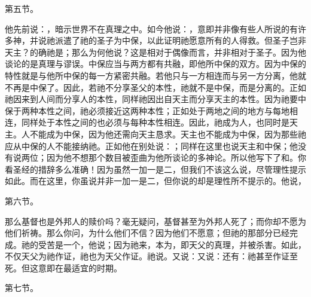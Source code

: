 第五节。\par

他先前说：，暗示世界不在真理之中。如今他说：，意即并非像有些人所说的有许多神，并说祂派遣了祂的圣子为中保，以此证明祂愿意所有的人得救。但圣子岂非天主？的确祂是；那么为何他说？这是相对于偶像而言，并非相对于圣子。因为他谈论的是真理与谬误。中保应当与两方都有共融，即他所中保的双方。因为中保的特性就是与他所中保的每一方紧密共融。若他只与一方相连而与另一方分离，他就不再是中保了。因此，若祂不分享圣父的本性，祂就不是中保，而是分离的。正如祂因来到人间而分享人的本性，同样祂因出自天主而分享天主的本性。因为祂要中保于两种本性之间，祂必须接近这两种本性；正如处于两地之间的地方与每地相连，同样处于本性之间的也必须与每种本性相连。因此，祂成为人，也同时是天主。人不能成为中保，因为他还需向天主恳求。天主也不能成为中保，因为那些祂应从中保的人不能接纳祂。正如他在别处说：；同样在这里也说天主和中保；他没有说两位；因为他不想那个数目被歪曲为他所谈论的多神论。所以他写下了和。你看圣经的措辞多么准确！因为虽然一加一是二，但我们不该这么说，尽管理性提示如此。而在这里，你虽说并非一加一是二，但你说的却是理性所不提示的。他说，\par

第六节。\par

那么基督也是外邦人的赎价吗？毫无疑问，基督甚至为外邦人死了；而你却不愿为他们祈祷。那么你问，为什么他们不信？因为他们不愿意；但祂的那部分已经完成。祂的受苦是一个，他说；因为祂来，本为，即天父的真理，并被杀害。如此，不仅天父为祂作证，祂也为天父作证。祂说。又说：又说：还有：祂甚至作证至死。但这意即在最适宜的时期。\par

第七节。\par

